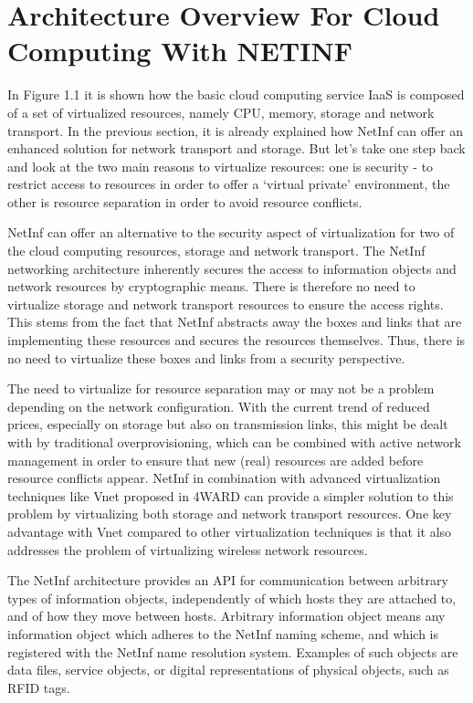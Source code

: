 \chapter{Architecture Overview For Cloud Computing With NETINF}
In Figure 1.1 it is shown how the basic cloud computing
service IaaS is composed of a set of virtualized resources,
namely CPU, memory, storage and network transport. In the
previous section, it is already explained how NetInf can
offer an enhanced solution for network transport and storage.
But let’s take one step back and look at the two main reasons
to virtualize resources: one is security - to restrict access to
resources in order to offer a ‘virtual private’ environment,
the other is resource separation in order to avoid resource
conflicts.

NetInf can offer an alternative to the security aspect of
virtualization for two of the cloud computing resources,
storage and network transport. The NetInf networking
architecture inherently secures the access to information
objects and network resources by cryptographic means.
There is therefore no need to virtualize storage and network
transport resources to ensure the access rights. This stems
from the fact that NetInf abstracts away the boxes and links
that are implementing these resources and secures the
resources themselves. Thus, there is no need to virtualize
these boxes and links from a security perspective.

The need to virtualize for resource separation may or
may not be a problem depending on the network
configuration. With the current trend of reduced prices,
especially on storage but also on transmission links, this
might be dealt with by traditional overprovisioning, which
can be combined with active network management in order
to ensure that new (real) resources are added before resource
conflicts appear. NetInf in combination with advanced
virtualization techniques like Vnet proposed in 4WARD can
provide a simpler solution to this problem by virtualizing
both storage and network transport resources. One key
advantage with Vnet compared to other virtualization
techniques is that it also addresses the problem of
virtualizing wireless network resources.

The NetInf architecture provides an API for
communication between arbitrary types of information
objects, independently of which hosts they are attached to,
and of how they move between hosts. Arbitrary
information object  means any information object which
adheres to the NetInf naming scheme, and which is
registered with the NetInf name resolution system. Examples
of such objects are data files, service objects, or digital
representations of physical objects, such as RFID tags.


